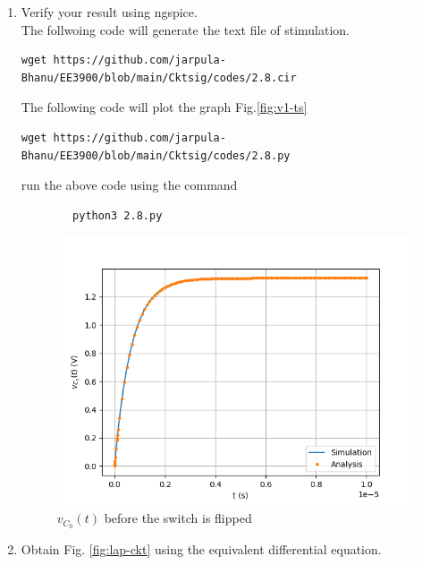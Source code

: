 \documentclass[journal,12pt,twocolumn]{IEEEtran}
\renewcommand\thesection{\arabic{section}}
\begin{document}
\begin{enumerate}[label=\arabic*.,ref=\thesection.\theenumi]
	\item Verify your result using ngspice.\\
	\solution  The follwoing code will generate the text file of stimulation.
    \begin{lstlisting}
wget https://github.com/jarpula-Bhanu/EE3900/blob/main/Cktsig/codes/2.8.cir
    \end{lstlisting}
    The following code will plot the graph Fig.\eqref{fig:v1-ts}
    \begin{lstlisting}
wget https://github.com/jarpula-Bhanu/EE3900/blob/main/Cktsig/codes/2.8.py
    \end{lstlisting}
        run the above code using the command
        \begin{lstlisting}
        python3 2.8.py
        \end{lstlisting}
    \begin{figure}[!ht]
        \includegraphics[width=\columnwidth]{./figs/2.8.png}
        \caption{$v_{C_0}(t)$ before the switch is flipped}
        \label{fig:v1-ts}
    \end{figure}
	\item Obtain Fig. 
			\ref{fig:lap-ckt}
			using the equivalent differential equation.
\end{enumerate}
\end{document}
